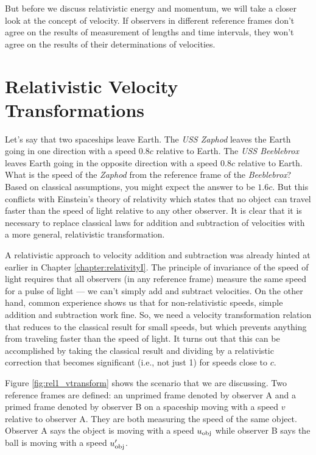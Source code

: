 But before we discuss relativistic energy and momentum, we will take
a closer look at the concept of velocity.  If observers in different
reference frames don't agree on the results of measurement of lengths 
and time intervals, they won't agree on the results of their determinations
of velocities. 


\section{Relativistic Velocity Transformations}

Let's say that two spaceships leave Earth.  The {\em USS Zaphod}
leaves the Earth going in one direction with a speed $0.8c$ relative
to Earth.  The {\em USS Beeblebrox} leaves Earth going in the opposite
direction with a speed $0.8c$ relative to Earth.  What is the speed
of the {\em Zaphod} from the reference frame of the {\em Beeblebrox}?
Based on classical assumptions, you might expect the answer to be
$1.6c$.  But this conflicts with Einstein's theory of relativity which
states that no object can travel faster than the speed of light
relative to any other observer.  It is clear that it is necessary to
replace classical laws for addition and subtraction of velocities with
a more general, relativistic transformation.

A relativistic approach to velocity addition and subtraction was already
hinted at earlier in Chapter \ref{chapter:relativityI}.  The principle
of invariance of the speed of light requires that all observers (in
any reference frame) measure the same speed for a pulse of light ---
we can't simply add and subtract velocities.  On the other hand, common
experience shows us that for non-relativistic speeds, simple addition
and subtraction work fine.  So, we need a velocity transformation
relation that reduces to the classical result for small speeds, but
which prevents anything from traveling faster than the speed of light.
It turns out that this can be accomplished by taking the classical result
and dividing by a relativistic correction that becomes significant (i.e.,
not just 1) for speeds close to $c$.

Figure \ref{fig:rel1_vtransform} shows the scenario that we are
discussing.  Two reference frames are defined: an unprimed frame
denoted by observer A and a primed frame denoted by observer B on a
spaceship moving with a speed $v$ relative to observer A.  They are both
measuring the speed of the same object.  Observer A says the object is
moving with a speed $u_{\rm obj}$ while observer B says the ball is
moving with a speed $u_{\rm obj}^\prime$.

